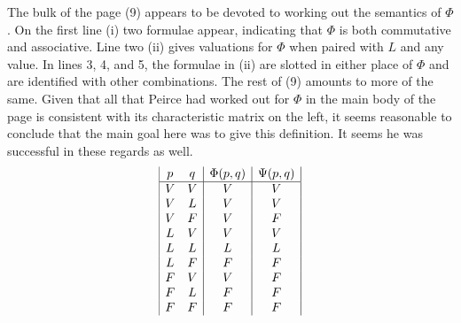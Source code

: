 The bulk of the page (9) appears to be devoted to working out the semantics of $\Phi$. On the first line (i) two formulae appear, indicating that $\Phi$ is both commutative and associative. Line two (ii) gives valuations for $\Phi$ when paired with $L$ and any value. In lines 3, 4, and 5, the formulae in (ii) are slotted in either place of $\Phi$ and are identified with other combinations. The rest of (9) amounts to more of the same. Given that all that Peirce had worked out for $\Phi$ in the main body of the page is consistent with its characteristic matrix on the left, it seems reasonable to conclude that the main goal here was to give this definition. It seems he was successful in these regards as well.
\begin{displaymath}
\begin{array}{|c c|c|c|}
p & q & \Phi(p, q) & \Psi(p, q)\\ %
\hline %
V & V & V & V\\
V & L & V & V\\
V & F & V & F\\
L & V & V & V\\
L & L & L & L\\
L & F & F & F\\
F & V & V & F\\
F & L & F & F\\
F & F & F & F\\
\end{array}
\end{displaymath}

